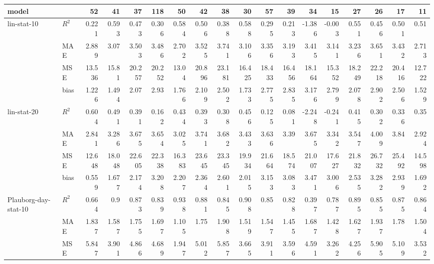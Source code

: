 \begin{tabular}{p{1.5cm}lrrrrrrrrrrrrrrrr}
\hline
 model                  &       &     52 &     41 &     37 &    118 &     50 &     42 &     38 &     30 &     57 &     39 &     34 &     15 &     27 &     26 &     17 &     11 \\
\hline
 lin-stat-10            & $R^2$ &  0.221 &  0.593 &  0.473 &  0.306 &  0.584 &  0.506 &  0.388 &  0.588 &  0.295 &  0.213 & -1.386 & -0.003 &  0.551 &  0.456 &  0.501 &  0.51  \\
                        & MAE   &  2.889 &  3.07  &  3.503 &  3.486 &  2.702 &  3.525 &  3.741 &  3.106 &  3.356 &  3.193 &  3.415 &  3.141 &  3.236 &  3.651 &  3.432 &  2.713 \\
                        & MSE   & 13.536 & 15.81  & 20.257 & 20.252 & 13.04  & 20.896 & 23.181 & 16.425 & 18.433 & 16.456 & 18.164 & 15.352 & 18.249 & 22.218 & 20.416 & 12.722 \\
                        & bias  &  1.226 &  1.494 &  2.07  &  2.93  &  1.766 &  2.109 &  2.502 &  1.733 &  2.775 &  2.835 &  3.176 &  2.799 &  2.078 &  2.902 &  2.506 &  1.529 \\
 lin-stat-20            & $R^2$ &  0.604 &  0.491 &  0.391 &  0.162 &  0.434 &  0.393 &  0.308 &  0.456 &  0.125 &  0.081 & -2.248 & -0.241 &  0.415 &  0.302 &  0.336 &  0.35  \\
                        & MAE   &  2.841 &  3.286 &  3.675 &  3.654 &  3.025 &  3.741 &  3.682 &  3.433 &  3.636 &  3.39  &  3.675 &  3.342 &  3.547 &  4.009 &  3.84  &  2.924 \\
                        & MSE   & 12.648 & 18.048 & 22.605 & 22.338 & 16.383 & 23.645 & 23.345 & 19.934 & 21.664 & 18.574 & 21.007 & 17.627 & 21.832 & 26.732 & 25.492 & 14.598 \\
                        & bias  &  0.559 &  1.677 &  2.174 &  3.208 &  2.207 &  2.364 &  2.601 &  2.015 &  3.153 &  3.083 &  3.471 &  3.006 &  2.535 &  3.282 &  2.939 &  1.692 \\
 Plauborg-day-stat-10   & $R^2$ &  0.664 &  0.9   &  0.873 &  0.839 &  0.938 &  0.881 &  0.845 &  0.908 &  0.85  &  0.828 &  0.397 &  0.787 &  0.895 &  0.855 &  0.875 &  0.864 \\
                        & MAE   &  1.837 &  1.587 &  1.755 &  1.697 &  1.105 &  1.75  &  1.908 &  1.519 &  1.547 &  1.455 &  1.687 &  1.428 &  1.627 &  1.937 &  1.78  &  1.504 \\
                        & MSE   &  5.847 &  3.901 &  4.866 &  4.689 &  1.947 &  5.012 &  5.857 &  3.665 &  3.911 &  3.596 &  4.591 &  3.262 &  4.256 &  5.905 &  5.109 &  3.532 \\

\end{tabular}
